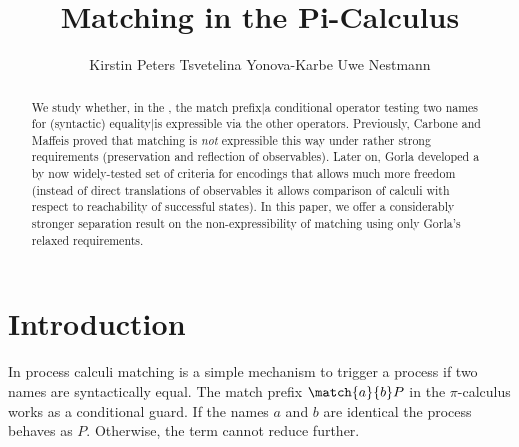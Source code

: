 \documentclass[final,copyright,creativecommons]{eptcs}
\title{Matching in the Pi-Calculus}
\author{Kirstin Peters \qquad\qquad Tsvetelina Yonova-Karbe \qquad\qquad Uwe Nestmann
\institute{TU Berlin, Germany}}
\begin{document}
\maketitle



\begin{abstract}
	We study whether, in the \piCal, the {match prefix}|{a} conditional operator testing two names for (syntactic) {equality}|{is} expressible via the other operators.
	Previously, Carbone and Maffeis proved that matching is \emph{not} expressible this way under rather strong requirements (preservation and reflection of observables).
	Later on, Gorla developed a by now widely-tested set of criteria for encodings that allows much more freedom (\eg instead of direct translations of observables it allows comparison of calculi with respect to reachability of successful states).
    In this paper, we offer a considerably stronger separation result on the non-expressibility of matching using only Gorla's relaxed requirements.
\end{abstract}



\section{Introduction}

In process calculi matching is a simple mechanism to trigger a process if two names are syntactically equal. The match prefix $ \match{a}{b}P $ in the $\pi$-calculus works as a conditional guard. If the names $ a $ and $ b $ are identical the process behaves as $ P $. Otherwise, the term cannot reduce further.
\end{document}
